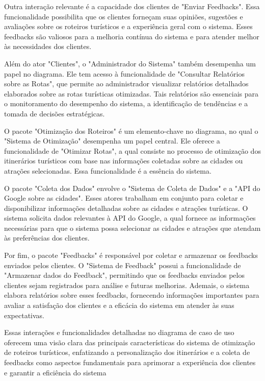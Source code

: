 Outra interação relevante é a capacidade dos clientes de "Enviar Feedbacks". Essa funcionalidade possibilita que os clientes forneçam suas opiniões, sugestões e avaliações sobre os roteiros turísticos e a experiência geral com o sistema. Esses feedbacks são valiosos para a melhoria contínua do sistema e para atender melhor às necessidades dos clientes.

Além do ator "Clientes", o "Administrador do Sistema" também desempenha um papel no diagrama. Ele tem acesso à funcionalidade de "Consultar Relatórios sobre as Rotas", que permite ao administrador visualizar relatórios detalhados elaborados sobre as rotas turísticas otimizadas. Tais relatórios são essenciais para o monitoramento do desempenho do sistema, a identificação de tendências e a tomada de decisões estratégicas.

O pacote "Otimização dos Roteiros" é um elemento-chave no diagrama, no qual o "Sistema de Otimização" desempenha um papel central. Ele oferece a funcionalidade de "Otimizar Rotas", a qual consiste no processo de otimização dos itinerários turísticos com base nas informações coletadas sobre as cidades ou atrações selecionadas. Essa funcionalidade é a essência do sistema.

O pacote "Coleta dos Dados" envolve o "Sistema de Coleta de Dados" e a "API do Google sobre as cidades". Esses atores trabalham em conjunto para coletar e disponibilizar informações detalhadas sobre as cidades e atrações turísticas. O sistema solicita dados relevantes à API do Google, a qual fornece as informações necessárias para que o sistema possa selecionar as cidades e atrações que atendam às preferências dos clientes.

Por fim, o pacote "Feedbacks" é responsável por coletar e armazenar os feedbacks enviados pelos clientes. O "Sistema de Feedback" possui a funcionalidade de "Armazenar dados do Feedback", permitindo que os feedbacks enviados pelos clientes sejam registrados para análise e futuras melhorias. Ademais, o sistema elabora relatórios sobre esses feedbacks, fornecendo informações importantes para avaliar a satisfação dos clientes e a eficácia do sistema em atender às suas expectativas.

Essas interações e funcionalidades detalhadas no diagrama de caso de uso oferecem uma visão clara das principais características do sistema de otimização de roteiros turísticos, enfatizando a personalização dos itinerários e a coleta de feedbacks como aspectos fundamentais para aprimorar a experiência dos clientes e garantir a eficiência do sistema

